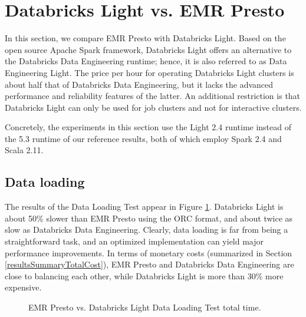 \section{Databricks Light vs. EMR Presto}\label{databricksLight}

In this section, we compare EMR Presto with Databricks Light. Based on the open source Apache Spark framework, Databricks Light offers an alternative to the Databricks Data Engineering runtime; hence, it is also referred to as Data Engineering Light. The price per hour for operating Databricks Light clusters is about half that of Databricks Data Engineering, but it lacks the advanced performance and reliability features of the latter. An additional restriction is that Databricks Light can only be used for job clusters and not for interactive clusters.

Concretely, the experiments in this section use the Light 2.4 runtime instead of the 5.3 runtime of our reference results, both of which employ Spark 2.4 and Scala 2.11.

\subsection{Data loading}

The results of the Data Loading Test appear in Figure \ref{fig:prestoVsDatabricksLightDataLoadingTotalTime}. Databricks Light is about 50\% slower than EMR Presto using the ORC format, and about twice as slow as Databricks Data Engineering. Clearly, data loading is far from being a straightforward task, and an optimized implementation can yield major performance improvements. In terms of monetary costs (summarized in Section \ref{resultsSummaryTotalCost}), EMR Presto and Databricks Data Engineering are close to balancing each other, while Databricks Light is more than 30\% more expensive.

\begin{figure}
   \begin{center}
   \end{center}
   \caption{EMR Presto vs. Databricks Light Data Loading Test total time.}
   \label{fig:prestoVsDatabricksLightDataLoadingTotalTime}
\end{figure}

